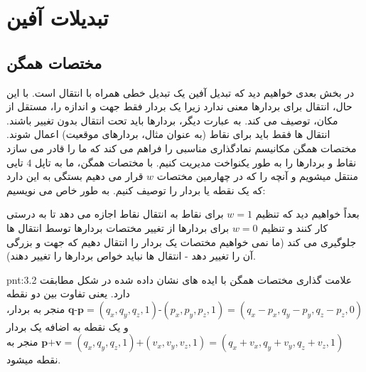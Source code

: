 \section{\textbf{تبدیلات آفین}}
\label{sec:3.2}

\subsection{\textbf{مختصات همگن}}
\label{subsec:3.2.1}
{
    \Large
    \begin{spacing}{1.5}
        در بخش بعدی خواهیم دید که تبدیل آفین یک تبدیل خطی همراه با انتقال است.
        با این حال، انتقال برای بردارها معنی ندارد زیرا یک بردار فقط جهت و اندازه را، مستقل از مکان، توصیف می کند.
        به عبارت دیگر، بردارها باید تحت انتقال بدون تغییر باشند.
        انتقال ها فقط باید برای نقاط (به عنوان مثال، بردارهای موقعیت) اعمال شوند.
        مختصات همگن مکانیسم نمادگذاری مناسبی را فراهم می کند که ما را قادر می سازد نقاط و بردارها را به طور یکنواخت مدیریت کنیم.
        با مختصات همگن، ما به تاپل $4$ تایی منتقل میشویم و آنچه را که در چهارمین مختصات $w$ قرار می دهیم بستگی به این دارد که یک نقطه یا بردار را توصیف کنیم.
        به طور خاص می نویسیم:


        بعداً خواهیم دید که تنظیم $w=1$ برای نقاط به انتقال نقاط اجازه می دهد تا به درستی کار کنند
        و تنظیم $w=0$  برای بردارها از تغییر مختصات بردارها توسط انتقال ها جلوگیری می کند
        (ما نمی خواهیم مختصات یک بردار را انتقال دهیم که جهت و بزرگی آن را تغییر دهد - انتقال ها نباید خواص بردارها را تغییر دهند).

        \begin{point}{pnt:3.2}
            \Large
            علامت گذاری مختصات همگن با ایده های نشان داده شده در شکل \label{fig:4.Session.1.1.17} مطابقت دارد.
            یعنی تفاوت بین دو نقطه $\textbf{q-p}=(q_{x},q_{y},q_{z},1)\textbf{-}(p_{x},p_{y},p_{z},1)=(q_{x}-p_{x},q_{y}-p_{y},q_{z}-p_{z},0)$ منجر به بردار،
            و یک نقطه به اضافه یک بردار $\textbf{p+v}=(q_{x},q_{y},q_{z},1)\textbf{+}(v_{x},v_{y},v_{z},1)=(q_{x}+v_{x},q_{y}+v_{y},q_{z}+v_{z},1)$ منجر به نقطه میشود.
        \end{point}
    \end{spacing}
}

